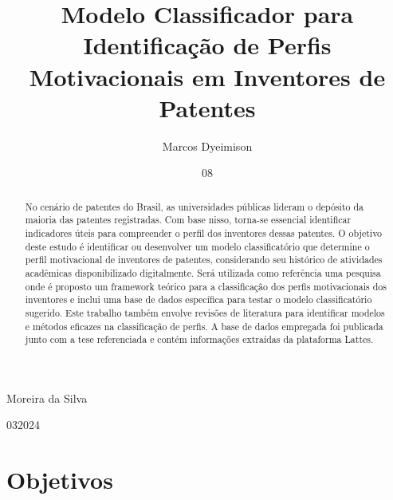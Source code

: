 \documentclass[tcc1,project]{uftex}
\begin{document}
  \title{Modelo Classificador para Identificação de Perfis Motivacionais em Inventores de Patentes}
  \author{Marcos Dyeimison}{Moreira da Silva}

  \date{08}{03}{2024}

  

  \maketitle

  \begin{abstract}

    No cenário de patentes do Brasil, as universidades públicas lideram o depósito da maioria das patentes registradas. Com base nisso, torna-se essencial identificar indicadores úteis para compreender o perfil dos inventores dessas patentes. O objetivo deste estudo é identificar ou desenvolver um modelo classificatório que determine o perfil motivacional de inventores de patentes, considerando seu histórico de atividades acadêmicas disponibilizado digitalmente. Será utilizada como referência uma pesquisa onde é proposto um framework teórico para a classificação dos perfis motivacionais dos inventores e inclui uma base de dados específica para testar o modelo classificatório sugerido. Este trabalho também envolve revisões de literatura para identificar modelos e métodos eficazes na classificação de perfis. A base de dados empregada foi publicada junto com a tese referenciada e contém informações extraídas da plataforma Lattes.

 \end{abstract}


\section*{Objetivos}
\end{document}
